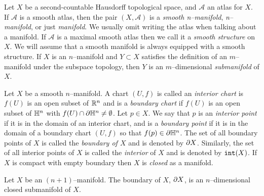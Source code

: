 \begin{defn}[Manifolds]
	\label{def:manifold}
	Let $X$ be a second-countable Hausdorff topological space, and $\mathcal{A}$ an atlas for $X$.
	If $\mathcal{A}$ is a smooth atlas, then the pair $(X,\mathcal{A})$ is a \emph{smooth n--manifold},  \emph{n--manifold}, or just \emph{manifold}.
	We usually omit writing the atlas when talking about a manifold.
	If $\mathcal{A}$ is a maximal smooth atlas then we call it a \emph{smooth structure} on $X$.
	We will assume that a smooth manifold is always equipped with a smooth structure.
	If $X$ is an $n$--manifold and $Y\subset X$ satisfies the definition of an $m$--manifold under the subspace topology, then $Y$ is an $m$--dimensional \emph{submanifold} of $X$.
\end{defn}

\begin{defn}	
	\label{def:boundary}
	Let $X$ be a smooth $n$--manifold.
	A chart $(U,f)$ is called an \emph{interior chart} is $f(U)$ is an open subset of $\mathbb{R}^n$ and is a \emph{boundary chart} if $f(U)$ is an open subset of $\mathbb{H}^n$ with $f(U)\cap\partial \mathbb{H}^n\neq\emptyset$.
	Let $p\in X$.
	We say that $p$ is an \emph{interior point} if it is in the domain of an interior chart, and is a \emph{boundary point} if it is in the domain of a boundary chart $(U,f)$ so that $f(p)\in\partial\mathbb{H}^n$.
	The set of all boundary points of $X$ is called the \emph{boundary of $X$} and is denoted by $\partial X$.
	Similarly, the set of all interior points of $X$ is called the \emph{interior} of $X$ and is denoted by $\mathtt{int}(X)$.
	If $X$ is compact with empty boundary then $X$ is \emph{closed} as a manifold.
\end{defn}

\begin{prop}
	\label{prop:boundariesaremanifolds}
	Let $X$ be an $(n+1)$--manifold.
	The boundary of $X$, $\partial X$, is an $n$--dimensional closed submanifold of $X$.
\end{prop}

%


